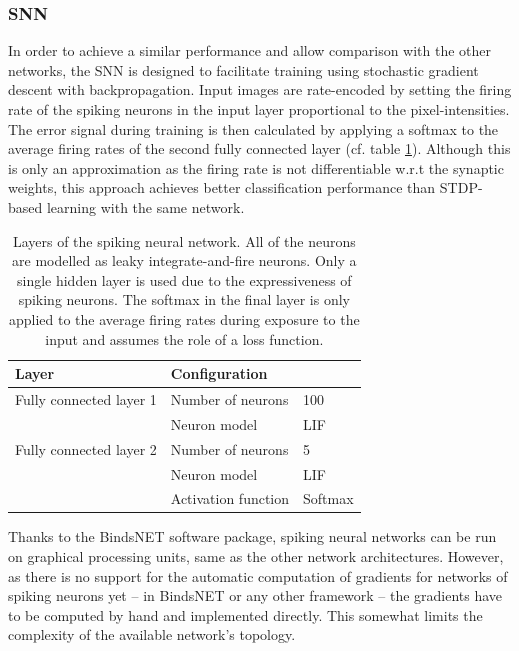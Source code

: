 \subsubsection{SNN}
In order to achieve a similar performance and allow comparison with the other networks, the SNN is designed to facilitate training using stochastic gradient descent with backpropagation. Input images are rate-encoded by setting the firing rate of the spiking neurons in the input layer proportional to the pixel-intensities. The error signal during training is then calculated by applying a softmax to the average firing rates of the second fully connected layer (cf. table \ref{tab:snn-config}). Although this is only an approximation as the firing rate is not differentiable w.r.t the synaptic weights, this approach achieves better classification performance than STDP-based learning with the same network.
\begin{table}[H]
\centering
\begin{tabular}{@{}lll@{}}
\toprule
Layer        & \multicolumn{2}{l}{Configuration} \\ \midrule
Fully connected layer 1 & Number of neurons      & 100     \\
             & Neuron model           & LIF      \\
Fully connected layer 2 & Number of neurons      & 5        \\
             & Neuron model           & LIF      \\
             & Activation function    & Softmax  \\ \bottomrule
\end{tabular}
\caption[Layers of the spiking neural network]{Layers of the spiking neural network. All of the neurons are modelled as leaky integrate-and-fire neurons. Only a single hidden layer is used due to the expressiveness of spiking neurons. The softmax in the final layer is only applied to the average firing rates during exposure to the input and assumes the role of a loss function.}
\label{tab:snn-config}
\end{table}\noindent
Thanks to the BindsNET software package, spiking neural networks can be run on graphical processing units, same as the other network architectures. However, as there is no support for the automatic computation of gradients for networks of spiking neurons yet -- in BindsNET or any other framework -- the gradients have to be computed by hand and implemented directly. This somewhat limits the complexity of the available network's topology.
